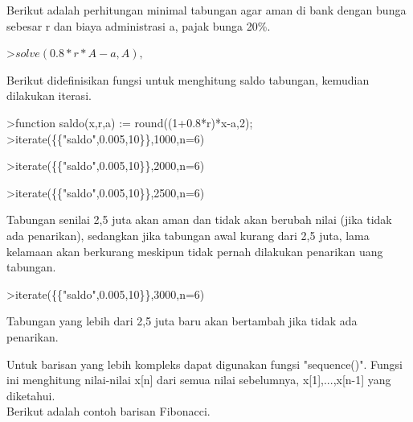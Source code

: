\documentclass[a4paper,10pt]{article}
\begin{document}
\begin{eulernotebook}
\begin{eulercomment}
\begin{eulercomment}
\begin{eulercomment}
Berikut adalah perhitungan minimal tabungan agar aman di bank dengan bunga sebesar r dan
biaya administrasi a, pajak bunga 20\%.
\end{eulercomment}
\begin{eulerprompt}
>$solve(0.8*r*A-a,A), $%
\end{eulerprompt}
\begin{eulercomment}
Berikut didefinisikan fungsi untuk menghitung saldo tabungan, kemudian dilakukan iterasi.
\end{eulercomment}
\begin{eulerprompt}
>function saldo(x,r,a) := round((1+0.8*r)*x-a,2);
>iterate(\{\{"saldo",0.005,10\}\},1000,n=6)
\end{eulerprompt}
\begin{euleroutput}
  [1000,  994,  987.98,  981.93,  975.86,  969.76,  963.64]
\end{euleroutput}
\begin{eulerprompt}
>iterate(\{\{"saldo",0.005,10\}\},2000,n=6)
\end{eulerprompt}
\begin{euleroutput}
  [2000,  1998,  1995.99,  1993.97,  1991.95,  1989.92,  1987.88]
\end{euleroutput}
\begin{eulerprompt}
>iterate(\{\{"saldo",0.005,10\}\},2500,n=6)
\end{eulerprompt}
\begin{euleroutput}
  [2500,  2500,  2500,  2500,  2500,  2500,  2500]
\end{euleroutput}
\begin{eulercomment}
Tabungan senilai 2,5 juta akan aman dan tidak akan berubah nilai (jika tidak ada penarikan),
sedangkan jika tabungan awal kurang dari 2,5 juta, lama kelamaan akan berkurang meskipun
tidak pernah dilakukan penarikan uang tabungan.
\end{eulercomment}
\begin{eulerprompt}
>iterate(\{\{"saldo",0.005,10\}\},3000,n=6)
\end{eulerprompt}
\begin{euleroutput}
  [3000,  3002,  3004.01,  3006.03,  3008.05,  3010.08,  3012.12]
\end{euleroutput}
\begin{eulercomment}
Tabungan yang lebih dari 2,5 juta baru akan bertambah jika tidak ada penarikan.

Untuk barisan yang lebih kompleks dapat digunakan fungsi "sequence()". Fungsi ini menghitung
nilai-nilai x[n] dari semua nilai sebelumnya, x[1],...,x[n-1] yang diketahui.\\
Berikut adalah contoh barisan Fibonacci.


\end{eulercomment}
\end{eulercomment}
\end{eulercomment}
\end{eulernotebook}
\end{document}
